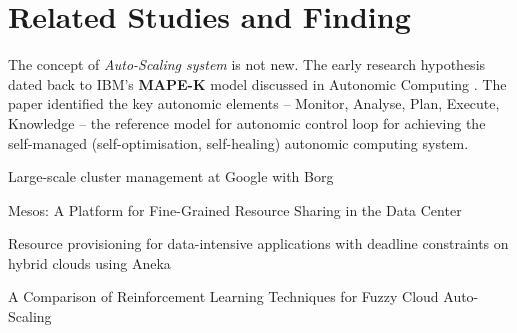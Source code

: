 \chapter{Related Studies and Finding} 

\label{Chapter5} 


The concept of \textit{Auto-Scaling system} is not new. The early research hypothesis dated back to IBM's \textbf{MAPE-K} model discussed in Autonomic Computing \parencite{1160055}. The paper identified the key autonomic elements  -- Monitor, Analyse, Plan, Execute, Knowledge -- the reference model for autonomic control loop for achieving the self-managed (self-optimisation, self-healing) autonomic computing system.

Large-scale cluster management at Google with Borg

Mesos: A Platform for Fine-Grained Resource Sharing in the Data Center

Resource provisioning for data-intensive applications with deadline constraints on hybrid clouds using Aneka

A Comparison of Reinforcement Learning Techniques for Fuzzy Cloud Auto-Scaling




